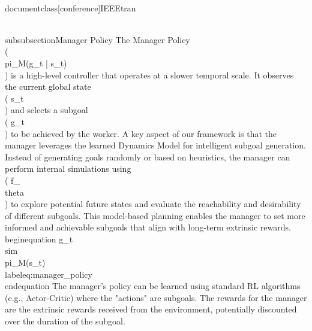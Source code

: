 \\documentclass[conference]{IEEEtran}
\begin{document}
\\subsubsection{Manager Policy}
The Manager Policy \\( \\pi_M(g_t | s_t) \\) is a high-level controller that operates at a slower temporal scale. It observes the current global state \\( s_t \\) and selects a subgoal \\( g_t \\) to be achieved by the worker. A key aspect of our framework is that the manager leverages the learned Dynamics Model for intelligent subgoal generation. Instead of generating goals randomly or based on heuristics, the manager can perform internal simulations using \\( f_\\theta \\) to explore potential future states and evaluate the reachability and desirability of different subgoals. This model-based planning enables the manager to set more informed and achievable subgoals that align with long-term extrinsic rewards.
\\begin{equation}
    g_t \\sim \\pi_M(s_t)
    \\label{eq:manager_policy}
\\end{equation}
The manager's policy can be learned using standard RL algorithms (e.g., Actor-Critic) where the "actions" are subgoals. The rewards for the manager are the extrinsic rewards received from the environment, potentially discounted over the duration of the subgoal.
\end{document}
